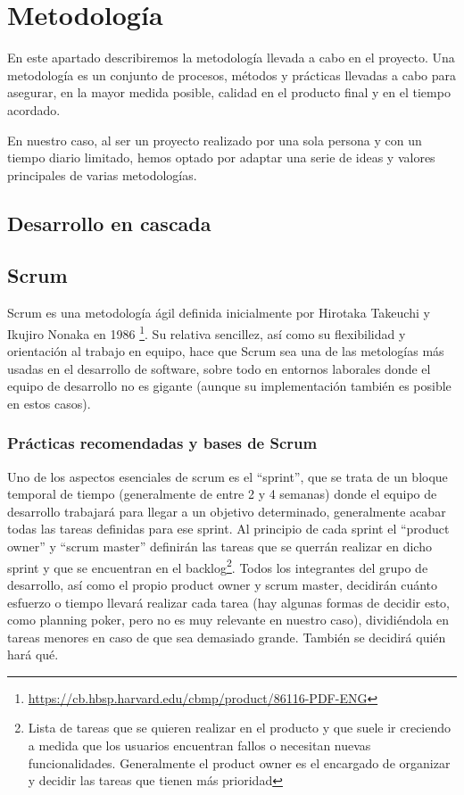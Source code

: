 \chapter{Metodología}

En este apartado describiremos la metodología llevada a cabo en el proyecto. Una metodología es un conjunto de procesos, métodos y prácticas llevadas a cabo para asegurar, en la mayor medida posible, calidad en el producto final y en el tiempo acordado.

En nuestro caso, al ser un proyecto realizado por una sola persona y con un tiempo diario limitado, hemos optado por adaptar una serie de ideas y valores principales de varias metodologías.

\section{Desarrollo en cascada}

\section{Scrum}

Scrum es una metodología ágil definida inicialmente por Hirotaka Takeuchi y Ikujiro Nonaka en 1986 \footnote{\url{https://cb.hbsp.harvard.edu/cbmp/product/86116-PDF-ENG}}. Su relativa sencillez, así como su flexibilidad y orientación al trabajo en equipo, hace que Scrum sea una de las metologías más usadas en el desarrollo de software, sobre todo en entornos laborales donde el equipo de desarrollo no es gigante (aunque su implementación también es posible en estos casos).

\subsection{Prácticas recomendadas y bases de Scrum}

Uno de los aspectos esenciales de scrum es el ``sprint'', que se trata de un bloque temporal de tiempo (generalmente de entre 2 y 4 semanas) donde el equipo de desarrollo trabajará para llegar a un objetivo determinado, generalmente acabar todas las tareas definidas para ese sprint. 
Al principio de cada sprint  el ``product owner'' y ``scrum master'' definirán las tareas que se querrán realizar en dicho sprint y que se encuentran en el backlog\footnote{Lista de tareas que se quieren realizar en el producto y que suele ir creciendo a medida que los usuarios encuentran fallos o necesitan nuevas funcionalidades. Generalmente el product owner es el encargado de organizar y decidir las tareas que tienen más prioridad}. Todos los integrantes del grupo de desarrollo, así como el propio product owner y scrum master, decidirán cuánto esfuerzo o tiempo llevará realizar cada tarea (hay algunas formas de decidir esto, como planning poker, pero no es muy relevante en nuestro caso), dividiéndola en tareas menores en caso de que sea demasiado grande. También se decidirá quién hará qué.

